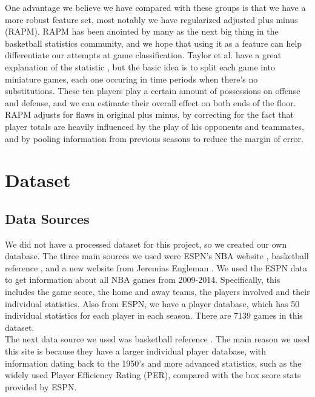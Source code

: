 \documentclass{article}
\begin{document}
	One advantage we believe we have compared with these groups is that we have a more robust feature set, most notably we have regularized adjusted plus minus (RAPM). RAPM has been anointed by many as the next big thing \cite{bigrpm} in the basketball statistics community, and we hope that using it as a feature can help differentiate our attempts at game classification. Taylor et al. have a great explanation of the statistic \cite{rpm}, but the basic idea is to split each game into miniature games, each one occuring in time periods when there's no substitutions. These ten players play a certain amount of possessions on offense and defense, and we can estimate their overall effect on both ends of the floor. RAPM adjusts for flaws in original plus minus, by correcting for the fact that player totals are heavily influenced by the play of his opponents and teammates, and by pooling information from previous seasons to reduce the margin of error. 

\section{Dataset}
	
	\subsection{Data Sources}
	We did not have a processed dataset for this project, so we created our own database. The three main sources we used were ESPN's NBA website \cite{espn}, basketball reference \cite{bball_ref}, and a new website from Jeremias Engleman \cite{rpm_data}. We used the ESPN data to get information about all NBA games from 2009-2014. Specifically, this includes the game score, the home and away teams, the players involved and their individual statistics. Also from ESPN, we have a player database, which has 50 individual statistics for each player in each season. There are 7139 games in this dataset. \\

	The next data source we used was basketball reference \cite{bball_ref}. The main reason we used this site is because they have a larger individual player database, with information dating back to the 1950's and more advanced statistics, such as the widely used Player Efficiency Rating (PER), compared with the box score stats provided by ESPN. \\
\end{document}
